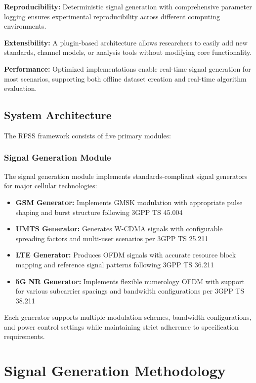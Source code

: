 \documentclass[twocolumn,10pt]{article}
\begin{document}
\textbf{Reproducibility:} Deterministic signal generation with comprehensive parameter logging ensures experimental reproducibility across different computing environments.

\textbf{Extensibility:} A plugin-based architecture allows researchers to easily add new standards, channel models, or analysis tools without modifying core functionality.

\textbf{Performance:} Optimized implementations enable real-time signal generation for most scenarios, supporting both offline dataset creation and real-time algorithm evaluation.

\subsection{System Architecture}

The RFSS framework consists of five primary modules:

\subsubsection{Signal Generation Module}

The signal generation module implements standards-compliant signal generators for major cellular technologies:

\begin{itemize}
\item \textbf{GSM Generator:} Implements GMSK modulation with appropriate pulse shaping and burst structure following 3GPP TS 45.004
\item \textbf{UMTS Generator:} Generates W-CDMA signals with configurable spreading factors and multi-user scenarios per 3GPP TS 25.211
\item \textbf{LTE Generator:} Produces OFDM signals with accurate resource block mapping and reference signal patterns following 3GPP TS 36.211
\item \textbf{5G NR Generator:} Implements flexible numerology OFDM with support for various subcarrier spacings and bandwidth configurations per 3GPP TS 38.211
\end{itemize}

Each generator supports multiple modulation schemes, bandwidth configurations, and power control settings while maintaining strict adherence to specification requirements.

\section{Signal Generation Methodology}
\end{document}
